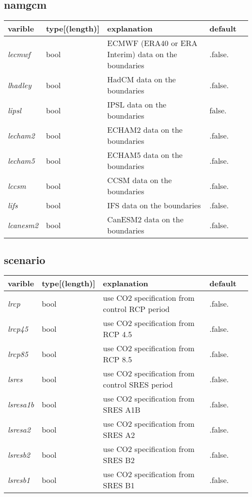\documentclass{article}
\begin{document}
\subsection{namgcm}
\begin{tabular}{|l|l|l|l|l|}
  \hline
  varible & type[(length)] & explanation & default\\
  \hline
  \hline
  \emph{lecmwf} & bool & ECMWF (ERA40 or ERA Interim) data on the boundaries & .false. \\
  \emph{lhadley} & bool & HadCM data on the boundaries &  .false.\\          
  \emph{lipsl}   & bool & IPSL data on the boundaries & false.   \\       
  \emph{lecham2} & bool & ECHAM2 data on the boundaries & .false.     \\     
  \emph{lecham5} & bool & ECHAM5 data on the boundaries & .false.       \\   
  \emph{lccsm}   & bool & CCSM data on the boundaries & .false.         \\ 
  \emph{lifs}    & bool & IFS data on the boundaries & .false. \\
  \emph{lcanesm2} & bool & CanESM2 data on the boundaries & .false. \\
  \hline
\end{tabular}

\subsection{scenario}
\begin{tabular}{|l|l|l|l|l|}
  \hline
  varible & type[(length)] & explanation & default\\
  \hline
  \hline
  \emph{lrcp} & bool & use CO2 specification from control RCP period  &.false. \\
  \emph{lrcp45} & bool & use CO2 specification from RCP 4.5  &.false. \\
  \emph{lrcp85} & bool & use CO2 specification from RCP 8.5  &.false. \\
  \emph{lsres} & bool & use CO2 specification from control SRES period  &.false. \\
  \emph{lsresa1b} & bool & use CO2 specification from SRES A1B  &.false. \\
  \emph{lsresa2} & bool & use CO2 specification from SRES A2  &.false. \\
  \emph{lsresb2} & bool & use CO2 specification from SRES B2  &.false. \\
  \emph{lsresb1} & bool & use CO2 specification from SRES B1  &.false. \\
  \hline
\end{tabular}
\end{document}
